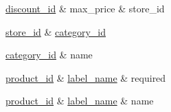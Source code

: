 \documentclass[a4paper, 12pt]{article}
\begin{document}
\newline
\begin{dependency}
    \begin{deptext}[TxtBook] %
        \underline{discount_id} \& max_price \& store_id \\
    \end{deptext}
\end{dependency}

\newline
\begin{dependency}
    \begin{deptext}[TxtBook] %
        \underline{store_id} \& \underline{category_id}  \\
    \end{deptext}
\end{dependency}

\newline
\begin{dependency}
    \begin{deptext}[TxtBook] %
        \underline{category_id} \& name \\
    \end{deptext}
\end{dependency}

\newline
\begin{dependency}
    \begin{deptext}[TxtBook] %
        \underline{product_id} \& \underline{label_name} \& required \\
    \end{deptext}
\end{dependency}

\newline
\begin{dependency}
    \begin{deptext}[TxtBook] %
        \underline{product_id} \& \underline{label_name} \& name \\
    \end{deptext}
\end{dependency}
\end{document}
